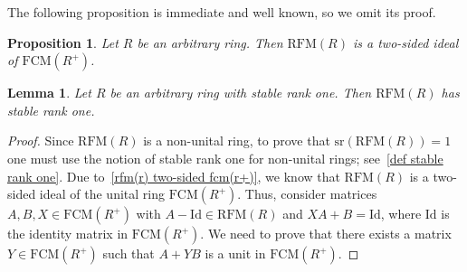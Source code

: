\documentclass[11pt]{amsart}
\numberwithin{equation}{section}
\newtheorem{lma}{Lemma}[section]
\newtheorem{prp}[prpCt]{Proposition}
\theoremstyle{definition}
\newcommand{\Id}{\mathrm{Id}}
\theoremstyle{plain}
\theoremstyle{definition}
\begin{document}
The following proposition is immediate and well known, so we omit its proof.

\begin{prp} \label{rfm(r) two-sided fcm(r+)}
Let $R$ be an arbitrary ring. Then $\mathrm{RFM}(R)$ is a two-sided ideal of $\mathrm{FCM}(R^+)$.
\end{prp}


\begin{lma} \label{RFM(R) has stable rank one}
Let $R$ be an arbitrary ring with stable rank one. Then $\mathrm{RFM}(R)$ has stable rank one.     
\end{lma}

\begin{proof}
Since $\mathrm{RFM}(R)$ is a non-unital ring, to prove that $\mathrm{sr}(\mathrm{RFM}(R))=1$ one must use the notion of stable rank one for non-unital rings; see~\autoref{def stable rank one}. Due to~\autoref{rfm(r) two-sided fcm(r+)}, we know that $\mathrm{RFM}(R)$ is a two-sided ideal of the unital ring $\mathrm{FCM}(R^+)$. Thus, consider matrices $A, B, X \in \mathrm{FCM}(R^+)$ with $A - \Id \in \mathrm{RFM}(R)$ and $XA + B = \Id$, where $\Id$ is the identity matrix in $\mathrm{FCM}(R^+)$. We need to prove that there exists a matrix $Y \in \mathrm{FCM}(R^+)$ such that $A + YB$ is a unit in $\mathrm{FCM}(R^+)$.


\end{proof}
\end{document}
